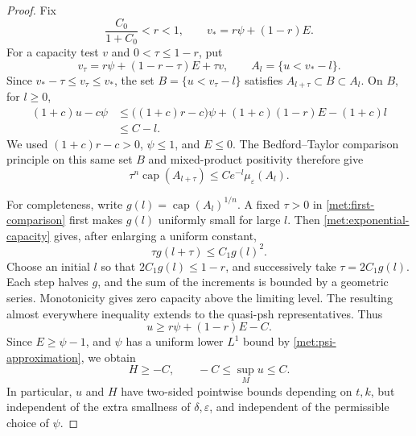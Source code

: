 \begin{proof}
Fix
\[
 \frac{C_0}{1+C_0}<r<1,
 \qquad v_*=r\psi+(1-r)E.
\]
For a capacity test \(v\) and \(0<\tau\leq1-r\), put
\[
 v_\tau=r\psi+(1-r-\tau)E+\tau v,
 \qquad A_l=\{u<v_*-l\}.
\]
Since \(v_*-\tau\leq v_\tau\leq v_*\), the set
\(B=\{u<v_\tau-l\}\) satisfies
\(A_{l+\tau}\subset B\subset A_l\).  On \(B\), for \(l\geq0\),
\begin{align*}
 (1+c)u-c\psi
 &\leq\bigl((1+c)r-c\bigr)\psi
       +(1+c)(1-r)E-(1+c)l\\
 &\leq C-l.
\end{align*}
We used \((1+c)r-c>0\), \(\psi\leq1\), and \(E\leq0\).
The Bedford--Taylor comparison principle on this same set \(B\)
and mixed-product positivity therefore give
\begin{equation}
 \label{met:first-comparison}
 \tau^n\operatorname{cap}(A_{l+\tau})
 \leq C e^{-l}\mu_\varepsilon(A_l).
\end{equation}

For completeness, write \(g(l)=\operatorname{cap}(A_l)^{1/n}\).
A fixed \(\tau>0\) in \eqref{met:first-comparison} first makes
\(g(l)\) uniformly small for large \(l\).  Then
\eqref{met:exponential-capacity} gives, after enlarging a uniform
constant,
\[
 \tau g(l+\tau)\leq C_1 g(l)^2.
\]
Choose an initial \(l\) so that \(2C_1g(l)\leq1-r\), and successively
take \(\tau=2C_1g(l)\).  Each step halves \(g\), and the sum of the
increments is bounded by a geometric series.  Monotonicity gives
zero capacity above the limiting level.  The resulting almost
everywhere inequality extends to the quasi-psh representatives.
Thus
\begin{equation}
 \label{met:first-lower-bound}
 u\geq r\psi+(1-r)E-C.
\end{equation}
Since \(E\geq\psi-1\), and \(\psi\) has a uniform lower \(L^1\)
bound by \eqref{met:psi-approximation}, we obtain
\begin{equation}
 \label{met:H-normalization}
 H\geq-C,
 \qquad -C\leq\sup_M u\leq C.
\end{equation}
In particular, \(u\) and \(H\) have two-sided pointwise bounds
depending on \(t,k\), but independent of the extra smallness of
\(\delta,\varepsilon\), and independent of the permissible choice of
\(\psi\).


\end{proof}
